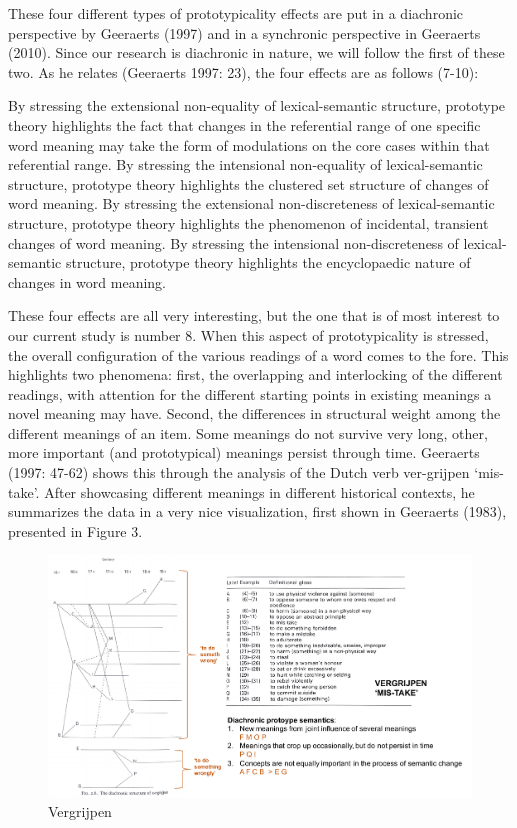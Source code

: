 \documentclass[12pt,article,oneside]{memoir}
\theoremstyle{definition}
\theoremstyle{definition}
\theoremstyle{definition}
\theoremstyle{remark}
\begin{document}
These four different types of prototypicality effects are put in a
diachronic perspective by Geeraerts (1997) and in a synchronic
perspective in Geeraerts (2010). Since our research is diachronic in
nature, we will follow the first of these two. As he relates (Geeraerts
1997: 23), the four effects are as follows (7-10):

\begin{exe}
    \ex By stressing the extensional non-equality of lexical-semantic structure, prototype theory highlights the fact that changes in the referential range of one specific word meaning may take the form of modulations on the core cases within that referential range.
    \ex By stressing the intensional non-equality of lexical-semantic structure, prototype theory highlights the clustered set structure of changes of word meaning.
    \ex By stressing the extensional non-discreteness of lexical-semantic structure, prototype theory highlights the phenomenon of incidental, transient changes of word meaning.
    \ex By stressing the intensional non-discreteness of lexical-semantic structure, prototype theory highlights the encyclopaedic nature of changes in word meaning.
\end{exe}

These four effects are all very interesting, but the one that is of most
interest to our current study is number 8. When this aspect of
prototypicality is stressed, the overall configuration of the various
readings of a word comes to the fore. This highlights two phenomena:
first, the overlapping and interlocking of the different readings, with
attention for the different starting points in existing meanings a novel
meaning may have. Second, the differences in structural weight among the
different meanings of an item. Some meanings do not survive very long,
other, more important (and prototypical) meanings persist through time.
Geeraerts (1997: 47-62) shows this through the analysis of the Dutch
verb ver-grijpen `mis-take'. After showcasing different meanings in
different historical contexts, he summarizes the data in a very nice
visualization, first shown in Geeraerts (1983), presented in Figure 3.

\begin{figure}
\centering
\includegraphics{ideos/vergrijpen.pdf}
\caption{\label{fig:levels}Vergrijpen}
\end{figure}
\end{document}
